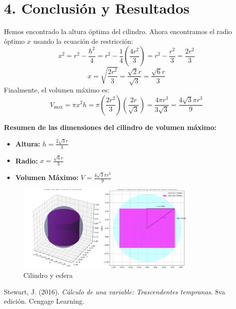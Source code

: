\documentclass[12pt, letterpaper]{article}
\begin{document}
\section*{4. Conclusión y Resultados}
Hemos encontrado la altura óptima del cilindro. Ahora encontramos el radio óptimo $x$ usando la ecuación de restricción:
$$ x^2 = r^2 - \frac{h^2}{4} = r^2 - \frac{1}{4}\left(\frac{4r^2}{3}\right) = r^2 - \frac{r^2}{3} = \frac{2r^2}{3} $$
$$ x = \sqrt{\frac{2r^2}{3}} = \frac{\sqrt{2}r}{\sqrt{3}} = \frac{\sqrt{6}r}{3} $$
Finalmente, el volumen máximo es:
$$ V_{\text{max}} = \pi x^2 h = \pi \left(\frac{2r^2}{3}\right) \left(\frac{2r}{\sqrt{3}}\right) = \frac{4\pi r^3}{3\sqrt{3}} = \frac{4\sqrt{3}\pi r^3}{9} $$

\vspace{0.5cm}

\textbf{Resumen de las dimensiones del cilindro de volumen máximo:}
\begin{itemize}
    \item \textbf{Altura:} $h = \frac{2\sqrt{3}r}{3}$
    \item \textbf{Radio:} $x = \frac{\sqrt{6}r}{3}$
    \item \textbf{Volumen Máximo:} $V = \frac{4\sqrt{3}\pi r^3}{9}$
\end{itemize}

\begin{figure}[h!]
    \centering
    \includegraphics[width=0.8\textwidth]{Figure_7.png}
    \caption{Cilindro y esfera}
    \label{fig:Figure_2}
\end{figure}

\begin{thebibliography}{9}
 Stewart, J. (2016). \textit{Cálculo de una variable: Trascendentes tempranas}. 8va edición. Cengage Learning.
\end{thebibliography}
\end{document}
